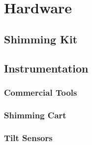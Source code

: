 \section{Hardware}
\label{sec:Hardware}

\subsection{Shimming Kit}

\subsection{Instrumentation}

\subsubsection{Commercial Tools}

\subsubsection{Shimming Cart}

\subsubsection{Tilt Sensors}

